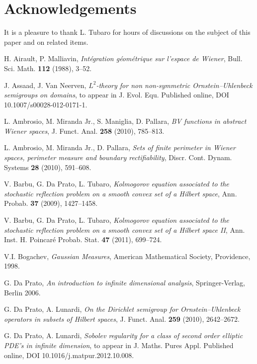 \documentclass[reqno,twoside,12pt]{amsart}
\begin{document}
\section{Acknowledgements}

It is a pleasure to thank  L. Tubaro for hours of discussions on the subject of this paper  and on related items.
 
\begin{thebibliography}{99}

H. Airault,  P. Malliavin, \textit{Int\'egration g\'eom\'etrique sur l'espace de Wiener},  Bull. Sci. Math. {\bf 112} (1988),  3--52. 

 J. Assaad, J. Van Neerven, \textit{$L^2$-theory for non non-symmetric Ornstein--Uhlenbeck semigroups on domains}, to appear in J. Evol. Equ. Published online, DOI 10.1007/s00028-012-0171-1. 

L. Ambrosio,  M. Miranda Jr., S. Maniglia,  D. Pallara, 
\textit{BV functions in abstract Wiener spaces}, J. Funct. Anal. {\bf 258} (2010), 785--813. 

L. Ambrosio,  M. Miranda Jr.,  D. Pallara, 
\textit{Sets of finite perimeter in Wiener spaces, perimeter measure and boundary rectifiability}, Discr. Cont. Dynam. Systems {\bf 28} (2010), 591--608. 

 V.  Barbu, G. Da Prato, L. Tubaro,  \textit{ Kolmogorov equation associated to the stochastic reflection problem
on a smooth convex set of a Hilbert space}, Ann. Probab. {\bf 37} (2009), 1427--1458. 

 V.  Barbu, G. Da Prato, L. Tubaro,   \textit{Kolmogorov equation associated to the stochastic reflection problem on a smooth convex set of a Hilbert space II},  Ann. Inst. H. Poincar\'e Probab. Stat. {\bf 47} (2011), 699--724.
   
  V.I. Bogachev, \textit{Gaussian Measures}, American Mathematical Society, Providence, 1998.

 G. Da Prato, \textit{An introduction to infinite dimensional analysis}, Springer-Verlag, Berlin 2006. 

 G. Da Prato, A. Lunardi, \textit{On the Dirichlet semigroup for Ornstein--Uhlenbeck 
operators in subsets of Hilbert spaces}, J. Funct. Anal. {\bf 259} (2010), 2642--2672. 

 G. Da Prato, A. Lunardi, \textit{Sobolev regularity for a class of second order elliptic PDE's in infinite dimension}, to appear in J. Maths. Pures Appl. Published online, DOI 10.1016/j.matpur.2012.10.008. 


\end{thebibliography}
\end{document}
